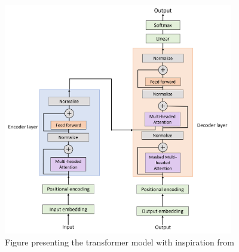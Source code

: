\begin{figure}[ht]
    \centering
    \includegraphics[width=10cm]{img/transformer_model.png}
    \caption{Figure presenting the transformer model with inspiration from \cite{46201}}
    \label{fig:TD}
\end{figure}


